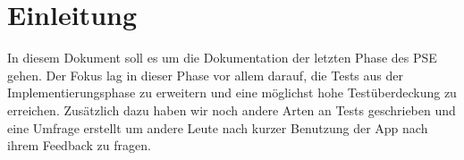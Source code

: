 
\section{Einleitung}

    In diesem Dokument soll es um die Dokumentation der letzten Phase des PSE gehen. Der Fokus lag in dieser Phase vor allem darauf, die Tests aus der Implementierungsphase zu erweitern und eine möglichst hohe Testüberdeckung zu erreichen.
    Zusätzlich dazu haben wir noch andere Arten an Tests geschrieben und eine Umfrage erstellt um andere Leute nach kurzer Benutzung der App nach ihrem Feedback zu fragen.

